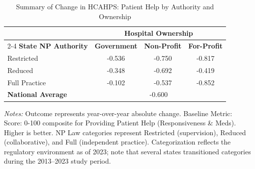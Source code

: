 \begin{table}[htbp]
    \centering
    \caption{Summary of Change in HCAHPS: Patient Help by Authority and Ownership}
    \label{tab:d_hcahps_grp2}
    \vspace{0.2cm}
    \begin{tabular}{lccc}
        \toprule
        & \multicolumn{3}{c}{\textbf{Hospital Ownership}} \\
        \cmidrule(lr){2-4}
        \textbf{State NP Authority} & \textbf{Government} & \textbf{Non-Profit} & \textbf{For-Profit} \\
        \midrule
        Restricted & -0.536 & -0.750 & -0.817 \\
        Reduced & -0.348 & -0.692 & -0.419 \\
        Full Practice & -0.102 & -0.537 & -0.852 \\
        \midrule
        \textbf{National Average} & \multicolumn{3}{c}{-0.600} \\
        \bottomrule
    \end{tabular}
    \vspace{0.1cm}
    \begin{minipage}{0.85\textwidth}
        \footnotesize \textit{Notes:} Outcome represents year-over-year absolute change. Baseline Metric: Score: 0-100 composite for Providing Patient Help (Responsiveness \& Meds). Higher is better. NP Law categories represent Restricted (supervision), Reduced (collaborative), and Full (independent practice). Categorization reflects the regulatory environment as of 2023; note that several states transitioned categories during the 2013--2023 study period.
    \end{minipage}
\end{table}